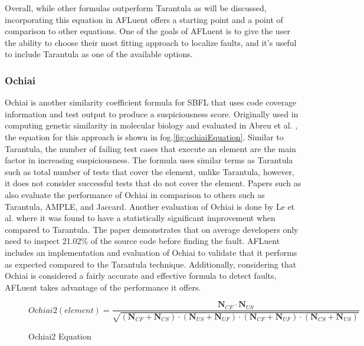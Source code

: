 Overall, while other formulas outperform Tarantula as will be discussed,
incorporating this equation in AFLuent offers a starting point and a point of
comparison to other equations. One of the goals of AFLuent is to give the user
the ability to choose their most fitting approach to localize faults, and it's
useful to include Tarantula as one of the available options.

\subsubsection{Ochiai}
\label{subsubsec:ochiai_lit}

Ochiai is another similarity coefficient formula for SBFL that uses code
coverage information and test output to produce a suspiciousness score.
Originally used in computing genetic similarity in molecular biology and
evaluated in Abreu et al. \cite{Abreu2006Ochiai}, the equation for this approach
is shown in fog.\ref{fig:ochiaiEquation}. Similar to Tarantula, the number of
failing test cases that execute an element are the main factor in increasing
suspiciousness. The formula uses similar terms as Tarantula such as total number
of tests that cover the element, unlike Tarantula, however, it does not consider
successful tests that do not cover the element.
Papers such as \cite{Abreu2006Ochiai,ABREU20091780} also evaluate the
performance of Ochiai in comparison to others such as Tarantula, AMPLE, and
Jaccard. Another evaluation of Ochiai is done by Le et al. \cite{le2013theory}
where it was found to have a statistically significant improvement when compared
to Tarantula. The paper demonstrates that on average developers only need to
inspect 21.02\% of the source code before finding the fault.
AFLuent includes an implementation and evaluation of Ochiai to
validate that it performs as expected compared to the Tarantula technique.
Additionally, considering that Ochiai is considered a fairly accurate and
effective formula to detect faults, AFLuent takes advantage of the performance
it offers.

\begin{figure}[!htb]
	\begin{center}
		\begin{equation}
			Ochiai2(element) = \frac{\textbf{N$_{CF}$}\cdot{\textbf{N$_{US}$}}}{\sqrt{(\textbf{N$_{CF}$}  + \textbf{N$_{CS}$}) \cdot (\textbf{N$_{US}$}  + \textbf{N$_{UF}$}) \cdot (\textbf{N$_{CF}$}  + \textbf{N$_{UF}$}) \cdot (\textbf{N$_{CS}$}  + \textbf{N$_{US}$})}}
		\end{equation}
		\caption{\label{fig:ochiai2Equation} Ochiai2 Equation\cite{wong2016survey}}
	\end{center}
\end{figure}

